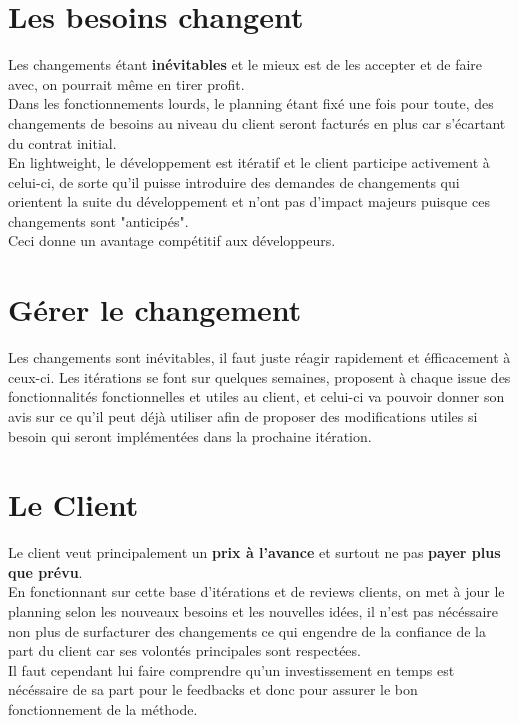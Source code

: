 \documentclass{report}
\begin{document}
	\section{Les besoins changent}

		Les changements étant \textbf{inévitables} et le mieux est de les accepter et de faire avec, on pourrait même en tirer profit.\\

		Dans les fonctionnements lourds, le planning étant fixé une fois pour toute, des changements de besoins au niveau du client seront facturés en plus car s'écartant du contrat initial.\\

		En lightweight, le développement est itératif et le client participe activement à celui-ci, de sorte qu'il puisse introduire des demandes de changements qui orientent la suite du développement et n'ont pas d'impact majeurs puisque ces changements sont "anticipés".\\
		Ceci donne un avantage compétitif aux développeurs.\\

	\section{Gérer le changement}

		Les changements sont inévitables, il faut juste réagir rapidement et éfficacement à ceux-ci. Les itérations se font sur quelques semaines, proposent à chaque issue des fonctionnalités fonctionnelles et utiles au client, et celui-ci va pouvoir donner son avis sur ce qu'il peut déjà utiliser afin de proposer des modifications utiles si besoin qui seront implémentées dans la prochaine itération.\\

	\section{Le Client}

		Le client veut principalement un \textbf{prix à l'avance} et surtout ne pas \textbf{payer plus que prévu}.\\
		En fonctionnant sur cette base d'itérations et de reviews clients, on met à jour le planning selon les nouveaux besoins et les nouvelles idées, il n'est pas nécéssaire non plus de surfacturer des changements ce qui engendre de la confiance de la part du client car ses volontés principales sont respectées.\\
		Il faut cependant lui faire comprendre qu'un investissement en temps est nécéssaire de sa part pour le feedbacks et donc pour assurer le bon fonctionnement de la méthode.\\
\end{document}
